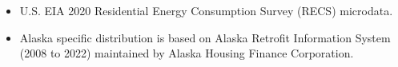 \begin{itemize}
\item U.S. EIA 2020 Residential Energy Consumption Survey (RECS) microdata.
\item Alaska specific distribution is based on Alaska Retrofit Information System (2008 to 2022) maintained by Alaska Housing Finance Corporation.
\end{itemize}
